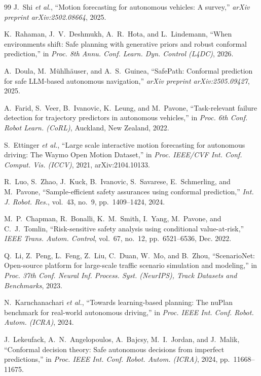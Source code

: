 \documentclass[lettersize,journal]{IEEEtran}
\begin{document}
\begin{thebibliography}{99}
J.~Shi \emph{et al.}, ``Motion forecasting for autonomous vehicles: A
survey,'' \emph{arXiv preprint arXiv:2502.08664}, 2025.

K.~Rahaman, J.~V.~Deshmukh, A.~R.~Hota, and L.~Lindemann, ``When
environments shift: Safe planning with generative priors and robust
conformal prediction,'' in \emph{Proc. 8th Annu. Conf. Learn. Dyn.
Control (L4DC)}, 2026.

A.~Doula, M.~M\"uhlh\"auser, and A.~S.~Guinea, ``SafePath: Conformal
prediction for safe LLM-based autonomous navigation,''
\emph{arXiv preprint arXiv:2505.09427}, 2025.

A.~Farid, S.~Veer, B.~Ivanovic, K.~Leung, and M.~Pavone, ``Task-relevant
failure detection for trajectory predictors in autonomous vehicles,''
in \emph{Proc. 6th Conf. Robot Learn. (CoRL)}, Auckland, New Zealand,
2022.

S.~Ettinger \emph{et al.}, ``Large scale interactive motion forecasting
for autonomous driving: The Waymo Open Motion Dataset,'' in \emph{Proc.
IEEE/CVF Int. Conf. Comput. Vis. (ICCV)}, 2021, arXiv:2104.10133.

R.~Luo, S.~Zhao, J.~Kuck, B.~Ivanovic, S.~Savarese, E.~Schmerling, and
M.~Pavone, ``Sample-efficient safety assurances using conformal
prediction,'' \emph{Int. J. Robot. Res.}, vol.~43, no.~9, pp.~1409--1424,
2024.

M.~P.~Chapman, R.~Bonalli, K.~M.~Smith, I.~Yang, M.~Pavone, and
C.~J.~Tomlin, ``Risk-sensitive safety analysis using conditional
value-at-risk,'' \emph{IEEE Trans. Autom. Control}, vol.~67, no.~12,
pp.~6521--6536, Dec. 2022.

Q.~Li, Z.~Peng, L.~Feng, Z.~Liu, C.~Duan, W.~Mo, and B.~Zhou,
``ScenarioNet: Open-source platform for large-scale traffic scenario
simulation and modeling,'' in \emph{Proc. 37th Conf. Neural Inf.
Process. Syst. (NeurIPS), Track Datasets and Benchmarks}, 2023.

N.~Karnchanachari \emph{et al.}, ``Towards learning-based planning: The
nuPlan benchmark for real-world autonomous driving,'' in \emph{Proc.
IEEE Int. Conf. Robot. Autom. (ICRA)}, 2024.

J.~Lekeufack, A.~N.~Angelopoulos, A.~Bajcsy, M.~I.~Jordan, and
J.~Malik, ``Conformal decision theory: Safe autonomous decisions from
imperfect predictions,'' in \emph{Proc. IEEE Int. Conf. Robot. Autom.
(ICRA)}, 2024, pp.~11668--11675.


\end{thebibliography}
\end{document}
